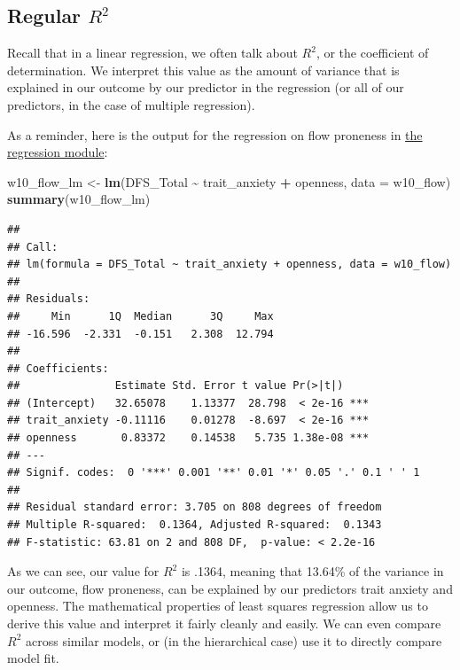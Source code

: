\documentclass[
]{book}
\newenvironment{Shaded}{\begin{snugshade}}{\end{snugshade}}
\newcommand{\AttributeTok}[1]{\textcolor[rgb]{0.13,0.29,0.53}{#1}}
\newcommand{\FunctionTok}[1]{\textcolor[rgb]{0.13,0.29,0.53}{\textbf{#1}}}
\newcommand{\NormalTok}[1]{#1}
\newcommand{\OtherTok}[1]{\textcolor[rgb]{0.56,0.35,0.01}{#1}}
\newcommand{\SpecialCharTok}[1]{\textcolor[rgb]{0.81,0.36,0.00}{\textbf{#1}}}
\begin{document}
\hypertarget{regular-r2}{%
\subsection{\texorpdfstring{Regular \(R^2\)}{Regular R\^{}2}}\label{regular-r2}}

Recall that in a linear regression, we often talk about \(R^2\), or the coefficient of determination. We interpret this value as the amount of variance that is explained in our outcome by our predictor in the regression (or all of our predictors, in the case of multiple regression).

As a reminder, here is the output for the regression on flow proneness in \protect\hyperlink{multreg-intro}{the regression module}:

\begin{Shaded}
\begin{Highlighting}[]
\NormalTok{w10\_flow\_lm }\OtherTok{\textless{}{-}} \FunctionTok{lm}\NormalTok{(DFS\_Total }\SpecialCharTok{\textasciitilde{}}\NormalTok{ trait\_anxiety }\SpecialCharTok{+}\NormalTok{ openness, }\AttributeTok{data =}\NormalTok{ w10\_flow)}
\FunctionTok{summary}\NormalTok{(w10\_flow\_lm)}
\end{Highlighting}
\end{Shaded}

\begin{verbatim}
## 
## Call:
## lm(formula = DFS_Total ~ trait_anxiety + openness, data = w10_flow)
## 
## Residuals:
##     Min      1Q  Median      3Q     Max 
## -16.596  -2.331  -0.151   2.308  12.794 
## 
## Coefficients:
##               Estimate Std. Error t value Pr(>|t|)    
## (Intercept)   32.65078    1.13377  28.798  < 2e-16 ***
## trait_anxiety -0.11116    0.01278  -8.697  < 2e-16 ***
## openness       0.83372    0.14538   5.735 1.38e-08 ***
## ---
## Signif. codes:  0 '***' 0.001 '**' 0.01 '*' 0.05 '.' 0.1 ' ' 1
## 
## Residual standard error: 3.705 on 808 degrees of freedom
## Multiple R-squared:  0.1364, Adjusted R-squared:  0.1343 
## F-statistic: 63.81 on 2 and 808 DF,  p-value: < 2.2e-16
\end{verbatim}

As we can see, our value for \(R^2\) is .1364, meaning that 13.64\% of the variance in our outcome, flow proneness, can be explained by our predictors trait anxiety and openness. The mathematical properties of least squares regression allow us to derive this value and interpret it fairly cleanly and easily. We can even compare \(R^2\) across similar models, or (in the hierarchical case) use it to directly compare model fit.
\end{document}
